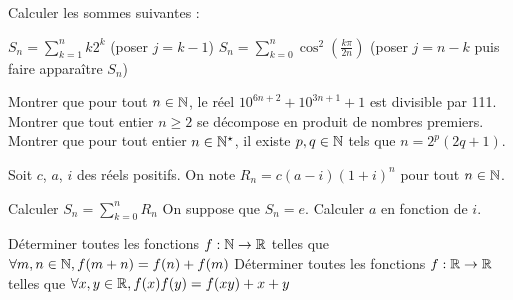 \begin{exercise}[subtitle=Changement d'indice, difficulty=*]
	Calculer les sommes suivantes :
	\begin{tasks}
		\task $S_n = \sum\limits_{k=1}^n k2^k$ (poser $j=k-1$)
	    \task $S_n = \sum\limits_{k=0}^n \cos^2 (\frac{k\pi}{2n})$ (poser $j=n-k$ puis faire apparaître $S_n$)
	\end{tasks}
\end{exercise}

\begin{exercise}[subtitle=Démonstrations par récurrence, difficulty=*]
	\begin{tasks}
		\task Montrer que pour tout $n\in \mathbb{N}$, le réel $10^{6n+2}+10^{3n+1}+1$ est divisible par 111.
		\task Montrer que tout entier $n \ge 2$ se décompose en produit de nombres premiers.
		\task Montrer que pour tout entier $n \in \mathbb{N}^\star$, il existe $p, q \in \mathbb{N}$ tels que $n=2^p(2q+1)$.
		
	\end{tasks}
\end{exercise}

\begin{exercise}[subtitle=Annuité constante, difficulty=*]
Soit $c$, $a$, $i$ des réels positifs. On note $R_n = c(a-i)(1+i)^n$ pour tout $n\in \mathbb{N}$. 
	\begin{tasks}
		\task Calculer $S_n = \sum\limits_{k=0}^n R_n$
		\task On suppose que $S_n = e$. Calculer $a$ en fonction de $i$.
	\end{tasks}
\end{exercise}



\begin{exercise}[subtitle=Analyse synthèse - fonctions, difficulty=*]
	\begin{tasks}
		\task Déterminer toutes les fonctions $f : \mathbb{N} \rightarrow \mathbb{R}$ telles que $\forall m,n \in \mathbb{N}, f(m+n) = f(n)+ f(m)$
		\task Déterminer toutes les fonctions $f : \mathbb{R} \rightarrow \mathbb{R}$ telles que $\forall x,y \in \mathbb{R}, f(x)f(y) = f(xy)+ x +y$
	\end{tasks}
\end{exercise}








